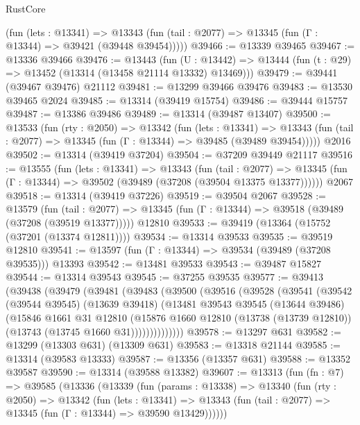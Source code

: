 \begin{lexlean}{RustCore}
\begin{coremodule}
      (fun (lets : @13341) =>
      @13343 (fun (tail : @2077) => @13345 (fun (Γ : @13344) => @39421 (@39448 @39454)))))
@39466 := @13339 @39465
@39467 := @13336 @39466
@39476 := @13443
    (fun (U : @13442) => @13444 (fun (t : @29) => @13452 (@13314 (@13458 @21114 @13332) @13469)))
@39479 := @39441 (@39467 @39476) @21112
@39481 := @13299 @39466 @39476
@39483 := @13530 @39465 @2024
@39485 := @13314 (@39419 @15754)
@39486 := @39444 @15757
@39487 := @13386 @39486
@39489 := @13314 (@39487 @13407)
@39500 := @13533
    (fun (rty : @2050) =>
    @13342
      (fun (lets : @13341) =>
      @13343 (fun (tail : @2077) => @13345 (fun (Γ : @13344) => @39485 (@39489 @39454)))))
    @2016
@39502 := @13314 (@39419 @37204)
@39504 := @37209 @39449 @21117
@39516 := @13555
    (fun (lets : @13341) =>
    @13343
      (fun (tail : @2077) =>
      @13345 (fun (Γ : @13344) => @39502 (@39489 (@37208 (@39504 @13375 @13377))))))
    @2067
@39518 := @13314 (@39419 @37226)
@39519 := @39504 @2067
@39528 := @13579
    (fun (tail : @2077) => @13345 (fun (Γ : @13344) => @39518 (@39489 (@37208 (@39519 @13377)))))
    @12810
@39533 := @39419 (@13364 (@15752 (@37201 (@13374 @12811))))
@39534 := @13314 @39533
@39535 := @39519 @12810
@39541 := @13597 (fun (Γ : @13344) => @39534 (@39489 (@37208 @39535))) @13393
@39542 := @13481 @39533
@39543 := @39487 @15827
@39544 := @13314 @39543
@39545 := @37255 @39535
@39577 := @39413
    (@39438
      (@39479
        (@39481
          (@39483
            (@39500
              (@39516
                (@39528
                  (@39541
                    (@39542
                      (@39544 @39545)
                      (@13639 @39418)
                      (@13481
                        @39543
                        @39545
                        (@13644 @39486)
                        (@15846
                          @1661
                          @31
                          @12810
                          (@15876
                            @1660
                            @12810
                            (@13738 (@13739 @12810))
                            (@13743 (@13745 @1660 @31))))))))))))))
@39578 := @13297 @631
@39582 := @13299 (@13303 @631) (@13309 @631)
@39583 := @13318 @21144
@39585 := @13314 (@39583 @13333)
@39587 := @13356 (@13357 @631)
@39588 := @13352 @39587
@39590 := @13314 (@39588 @13382)
@39607 := @13313
    (fun (fn : @7) =>
    @39585
      (@13336
        (@13339
          (fun (params : @13338) =>
          @13340
            (fun (rty : @2050) =>
            @13342
              (fun (lets : @13341) =>
              @13343 (fun (tail : @2077) => @13345 (fun (Γ : @13344) => @39590 @13429))))))

\end{coremodule}
\end{lexlean}
